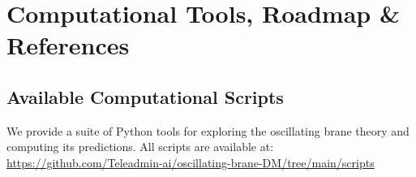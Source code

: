 
\chapter{Computational Tools, Roadmap \& References}
\label{ch:tools}

\section{Available Computational Scripts}
\label{sec:scripts}

We provide a suite of Python tools for exploring the oscillating brane theory and computing its predictions. All scripts are available at: \url{https://github.com/Teleadmin-ai/oscillating-brane-DM/tree/main/scripts}

